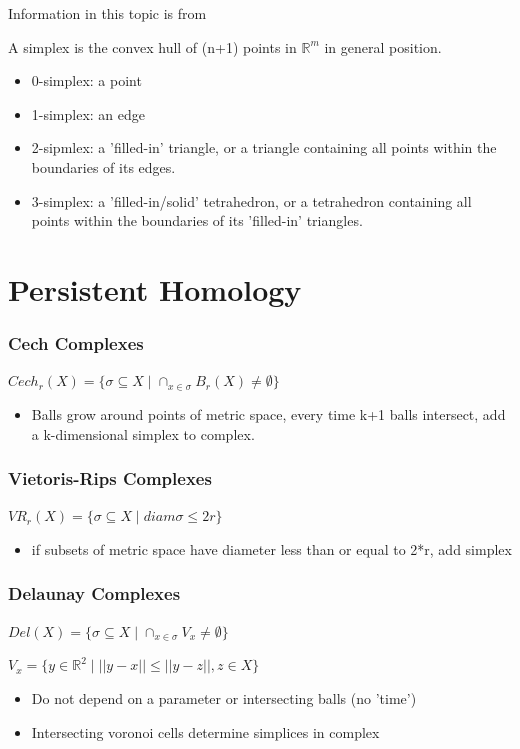 \documentclass[ma]{uncgdissertationexp}
\theoremstyle{plain}
\theoremstyle{definition}
\theoremstyle{remark}
\begin{document}
Information in this topic is from \cite{Hatcher_2001}

A simplex is the convex hull of (n+1) points in $\mathbb{R}^{m}$ in general position.
\begin{itemize}
\item 0-simplex: a point
\item 1-simplex: an edge
\item 2-sipmlex: a 'filled-in' triangle, or a triangle containing all points within the boundaries of its edges.
\item 3-simplex: a 'filled-in/solid' tetrahedron, or a tetrahedron containing all points within the boundaries of its 'filled-in' triangles.
\end{itemize}

\section{Persistent Homology}

\subsubsection{Cech Complexes}
$Cech_{r}(X) = \{\sigma \subseteq X \mid \cap_{x \in \sigma} B_{r}(X) \not= \emptyset\}$
\begin{itemize}
\item Balls grow around points of metric space, every time k+1 balls intersect, add a k-dimensional simplex to complex.
\end{itemize}

\subsubsection{Vietoris-Rips Complexes}
$VR_{r}(X) = \{\sigma \subseteq X \mid diam\sigma \leq 2r \}$
\begin{itemize}
\item if subsets of metric space have diameter less than or equal to 2*r, add simplex
\end{itemize}

\subsubsection{Delaunay Complexes}
$Del(X) = \{\sigma \subseteq X \mid \cap_{x \in \sigma} V_{x} \not= \emptyset\}$

$V_{x} = \{y \in \mathbb{R}^{2} \mid ||y-x|| \leq  ||y-z||, z \in X\}$
\begin{itemize}
\item Do not depend on a parameter or intersecting balls (no 'time')
\item Intersecting voronoi cells determine simplices in complex
\end{itemize}
\end{document}

